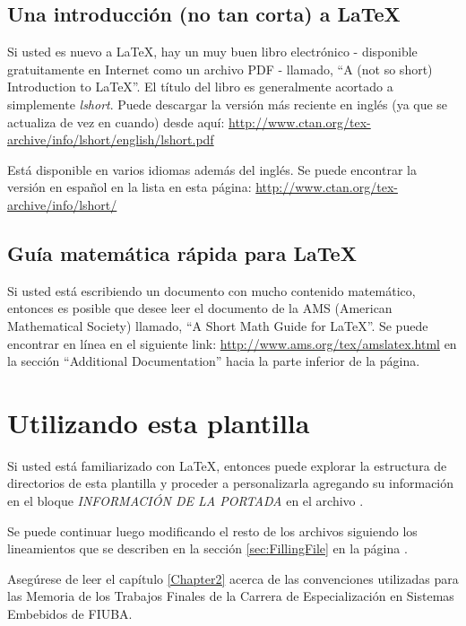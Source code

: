 \subsection{Una introducción (no tan corta) a \LaTeX{}}

Si usted es nuevo a \LaTeX{}, hay un muy buen libro electrónico - disponible gratuitamente en Internet como un archivo PDF - llamado, \enquote{A (not so short) Introduction to \LaTeX{}}. El título del libro es generalmente acortado a simplemente \emph{lshort}. Puede descargar la versión más reciente en inglés (ya que se actualiza de vez en cuando) desde aquí:
\url{http://www.ctan.org/tex-archive/info/lshort/english/lshort.pdf}

Está disponible en varios idiomas además del inglés. Se puede encontrar la versión en español en la lista en esta página: \url{http://www.ctan.org/tex-archive/info/lshort/}


\subsection{Guía matemática rápida para \LaTeX{}}

Si usted está escribiendo un documento con mucho contenido matemático, entonces es posible que desee leer el documento de la AMS (American Mathematical Society) llamado, \enquote{A Short Math Guide for \LaTeX{}}. Se puede encontrar en línea en el siguiente link: \url{http://www.ams.org/tex/amslatex.html} en la sección \enquote{Additional Documentation} hacia la parte inferior de la página.



\section{Utilizando esta plantilla}

Si usted está familiarizado con \LaTeX{}, entonces puede explorar la estructura de directorios de esta plantilla y proceder a personalizarla agregando su información en el bloque \emph{INFORMACIÓN DE LA PORTADA} en el archivo .  

Se puede continuar luego modificando el resto de los archivos siguiendo los lineamientos que se describen en la sección \ref{sec:FillingFile} en la página \pageref{sec:FillingFile}.

Asegúrese de leer el capítulo \ref{Chapter2} acerca de las convenciones utilizadas para las Memoria de los Trabajos Finales de la Carrera de Especialización en Sistemas Embebidos de FIUBA.

